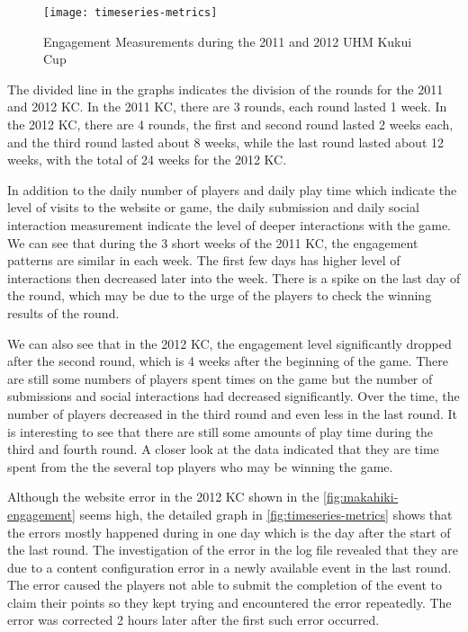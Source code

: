 \begin{figure}[ht!]
  \center
  \texttt{[image: timeseries-metrics]}
  \caption{Engagement Measurements during the 2011 and 2012 UHM Kukui Cup}
  \label{fig:timeseries-metrics}
\end{figure}

The divided line in the graphs indicates the division of the rounds for the 2011 and 2012 KC. In the 2011 KC, there are 3 rounds, each round lasted 1 week. In the 2012 KC, there are 4 rounds, the first and second round lasted 2 weeks each, and the third round lasted about 8 weeks, while the last round lasted about 12 weeks, with the total of 24 weeks for the 2012 KC. 

In addition to the daily number of players and daily play time which indicate the level of visits to the website or game, the daily submission and daily social interaction measurement indicate the level of deeper interactions with the game. We can see that during the 3 short weeks of the 2011 KC, the engagement patterns are similar in each week. The first few days has higher level of interactions then decreased later into the week. There is a spike on the last day of the round, which may be due to the urge of the players to check the winning results of the round. 

We can also see that in the 2012 KC, the engagement level significantly dropped after the second round, which is 4 weeks after the beginning of the game. There are still some numbers of players spent times on the game but the number of submissions and social interactions had decreased significantly. Over the time, the number of players decreased in the third round and even less in the last round. It is interesting to see that there are still some amounts of play time during the third and fourth round. A closer look at the data indicated that they are time spent from the the several top players who may be winning the game. 

Although the website error in the 2012 KC shown in the  \autoref{fig:makahiki-engagement} seems high, the detailed graph in \autoref{fig:timeseries-metrics} shows that the errors mostly happened during in one day which is the day after the start of the last round. The investigation of the error in the log file revealed that they are due to a content configuration error in a newly available event in the last round. The error caused the players not able to submit the completion of the event to claim their points so they kept trying and encountered the error repeatedly. The error was corrected 2 hours later after the first such error occurred.

